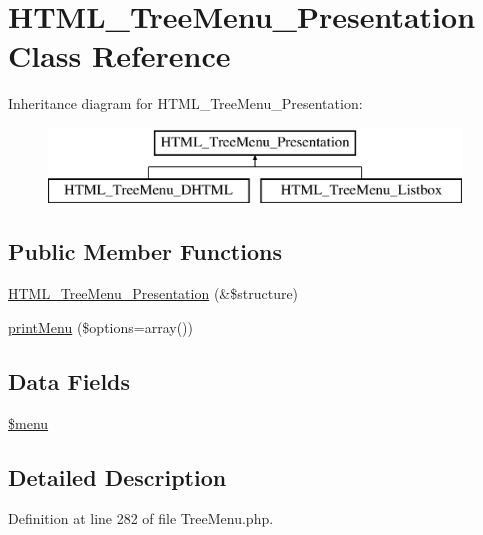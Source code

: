 \hypertarget{class_h_t_m_l___tree_menu___presentation}{\section{\-H\-T\-M\-L\-\_\-\-Tree\-Menu\-\_\-\-Presentation \-Class \-Reference}
\label{class_h_t_m_l___tree_menu___presentation}
}
\-Inheritance diagram for \-H\-T\-M\-L\-\_\-\-Tree\-Menu\-\_\-\-Presentation\-:\begin{figure}[H]
\begin{center}
\leavevmode
\includegraphics[height=2.000000cm]{class_h_t_m_l___tree_menu___presentation}
\end{center}
\end{figure}
\subsection*{\-Public \-Member \-Functions}
\begin{DoxyCompactItemize}
\item 
\hyperlink{class_h_t_m_l___tree_menu___presentation_a0e7ab066bc4bf3dd78fe6f3ece903aa4}{\-H\-T\-M\-L\-\_\-\-Tree\-Menu\-\_\-\-Presentation} (\&\$structure)
\item 
\hyperlink{class_h_t_m_l___tree_menu___presentation_a9a0565bd7466923acc0a20748fea9b36}{print\-Menu} (\$options=array())
\end{DoxyCompactItemize}
\subsection*{\-Data \-Fields}
\begin{DoxyCompactItemize}
\item 
\hyperlink{class_h_t_m_l___tree_menu___presentation_a44b0c947ca193a7764153898f5336910}{\$menu}
\end{DoxyCompactItemize}


\subsection{\-Detailed \-Description}


\-Definition at line 282 of file \-Tree\-Menu.\-php.



